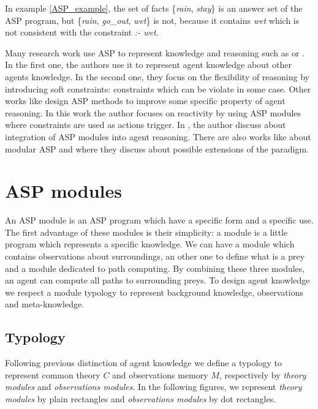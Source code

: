\documentclass{aamas2012}
\begin{document}
	In example \ref{ASP_example}, the set of facts \{\emph{rain}, \emph{stay}\} is an answer set of the ASP program, but \{\emph{rain}, \emph{go\_out}, \emph{wet}\} is not, 
	because it contains \emph{wet} which is not consistent with the constraint \emph{:- wet}.

	Many research work use ASP to represent knowledge and reasoning such as \cite{DBLP:conf/atal/BaralGSP10} or \cite{DBLP:conf/clima/NieuwenborghVHV06}.
	In the first one, the authors use it to represent agent knowledge about other agents knowledge.
	In the second one, they focus on the flexibility of reasoning by introducing soft constraints: constraints which can be violate in some case.
	Other works like \cite{DBLP:conf/datalog/Costantini10} design ASP methods to improve some specific property of agent reasoning.
	In this work the author focuses on reactivity by using ASP modules where constraints are used as actions trigger.
	In \cite{DBLP:conf/lpnmr/Costantini09}, the author discuss about integration of ASP modules into agent reasoning.
	There are also works like \cite{DBLP:conf/aaaiss/BaralAD06} about modular ASP and 
	\cite{DBLP:conf/birthday/FaberW11} where they discuss about possible extensions of the paradigm.

\section{ASP modules}

	An ASP module is an ASP program which have a specific form and a specific use.
	The first advantage of these modules is their simplicity: a module is a little program which represents a specific knowledge.
	We can have a module which contains observations about surroundings,
	an other one to define what is a prey and a module dedicated to path computing.
	By combining these three modules, an agent can compute all paths to surrounding preys.
	To design agent knowledge we respect a module typology to represent background knowledge, observations and meta-knowledge.

\subsection{Typology}

	Following previous distinction of agent knowledge we define a typology to represent common theory $C$ and observations memory $M$,
	respectively by \emph{theory modules} and \emph{observations modules}.
	In the following figures, we represent \emph{theory modules} by plain rectangles and \emph{observations modules} by dot rectangles.
\end{document}

